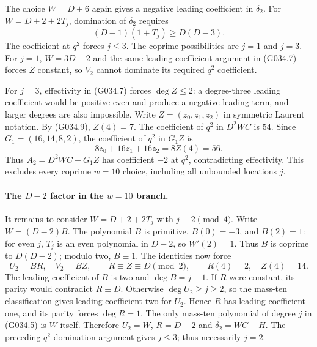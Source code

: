 The choice $W=D+6$ again gives a negative leading
coefficient in $\delta_2$. For
$W=D+2+2T_j$, domination of $\delta_2$ requires
\[
                       (D-1)(1+T_j)\ge D(D-3).
\]
The coefficient at $q^2$ forces $j\le3$.
The coprime possibilities are $j=1$ and $j=3$.
For $j=1$, $W=3D-2$ and the same leading-coefficient
argument in (G034.7) forces $Z$ constant, so $V_2$
cannot dominate its required $q^2$ coefficient.

For $j=3$, effectivity in (G034.7) forces
$\deg Z\le2$: a degree-three leading coefficient
would be positive even and produce a negative leading
term, and larger degrees are also impossible.
Write $Z=(z_0,z_1,z_2)$ in symmetric Laurent notation.
By (G034.9), $Z(4)=7$.
The coefficient of $q^2$ in $D^2WC$ is $54$.
Since $G_1=(16,14,8,2)$, the coefficient of $q^2$
in $G_1Z$ is
\[
        8z_0+16z_1+16z_2=8Z(4)=56.
\]
Thus $A_2=D^2WC-G_1Z$ has coefficient $-2$ at $q^2$,
contradicting effectivity. This excludes every coprime
$w=10$ choice, including all unbounded locations $j$.

\paragraph{The $D-2$ factor in the $w=10$ branch.}
It remains to consider $W=D+2+2T_j$ with
$j\equiv2\pmod4$. Write $W=(D-2)B$.
The polynomial $B$ is primitive, $B(0)=-3$, and
$B(2)=1$: for even $j$, $T_j$ is an even polynomial
in $D-2$, so $W'(2)=1$.
Thus $B$ is coprime to $D(D-2)$; modulo two,
$B\equiv1$. The identities now force
\[
 U_2=BR,\quad V_2=BZ,\qquad
 R\equiv Z\equiv D\pmod2,
 \qquad R(4)=2,\quad Z(4)=14.                       \tag{G034.10}
\]
The leading coefficient of $B$ is two and
$\deg B=j-1$. If $R$ were constant, its parity
would contradict $R\equiv D$.
Otherwise $\deg U_2\ge j\ge2$, so the mass-ten
classification gives leading coefficient two for $U_2$.
Hence $R$ has leading coefficient one, and its parity
forces $\deg R=1$. The only mass-ten polynomial of
degree $j$ in (G034.5) is $W$ itself. Therefore
$U_2=W$, $R=D-2$ and $\delta_2=WC-H$.
The preceding $q^2$ domination argument gives $j\le3$;
thus necessarily $j=2$.

